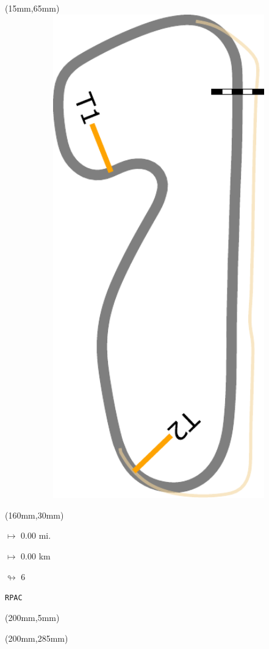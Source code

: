 \begin{textblock*}{185mm}(15mm,65mm)%
\centering
\mbox{\includegraphics[width=185mm,height=210mm,keepaspectratio]{PT/RPAC.pdf}}
\end{textblock*}
\begin{textblock*}{40mm}(160mm,30mm)%
\Large
\par$\mapsto$ 0.00 mi.
\par$\mapsto$ 0.00 km
\par$\looparrowright$ 6
\par\hfill\tiny\tt RPAC\\
\end{textblock*}
\begin{textblock*}{20mm}(200mm,5mm)%
\fbox{\thepage}
\label{RPAC}
\end{textblock*}
\begin{textblock*}{20mm}(200mm,285mm)%
\fbox{\thepage}
\end{textblock*}

